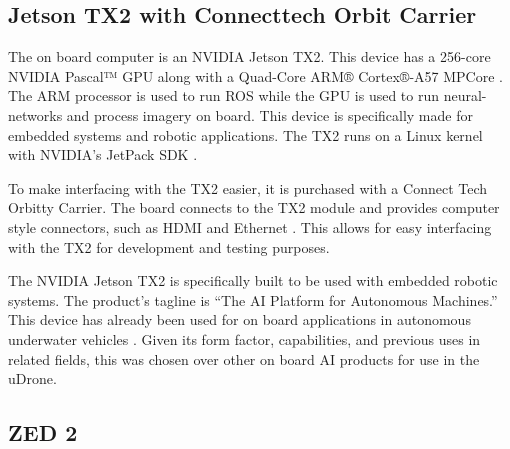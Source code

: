 
\subsection{Jetson TX2 with Connecttech Orbit Carrier}
The on board computer is an NVIDIA Jetson TX2. This device has a 256-core NVIDIA Pascal™ GPU along with a Quad-Core ARM® Cortex®-A57 MPCore \parencite{tx2}. The ARM processor is used to run ROS while the GPU is used to run neural-networks and process imagery on board. This device is specifically made for embedded systems and robotic applications. The TX2 runs on a Linux kernel with NVIDIA’s JetPack SDK \parencite{jetpack}.

To make interfacing with the TX2 easier, it is purchased with a Connect Tech Orbitty Carrier. The board connects to the TX2 module and provides computer style connectors, such as HDMI and Ethernet \parencite{orbitty}. This allows for easy interfacing with the TX2 for development and testing purposes. 

The NVIDIA Jetson TX2 is specifically built to be used with embedded robotic systems. The product’s tagline is “The AI Platform for Autonomous Machines.” This device has already been used for on board applications in autonomous underwater vehicles \parencite{MandersonGPU}.  Given its form factor, capabilities, and previous uses in related fields, this was chosen over other on board AI products for use in the uDrone. 

\subsection{ZED 2}

